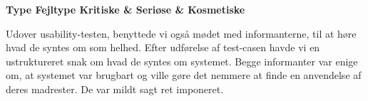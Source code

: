 \textbf{
           						 {Type}
       {Fejltype             	}{Kritiske   & Seriøse   & Kosmetiske}{
}
}

Udover usability-testen, benyttede vi også mødet med informanterne, til at høre hvad de syntes om \Foodl{} som helhed. Efter udførelse af test-casen havde vi en ustruktureret snak om hvad de syntes om systemet. Begge informanter var enige om, at systemet var brugbart og ville gøre det nemmere at finde en anvendelse af deres madrester. De var mildt sagt ret imponeret.
